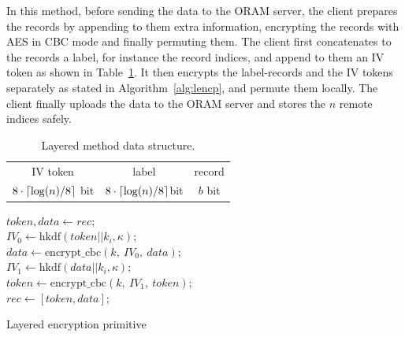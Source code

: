 \documentclass[USenglish,oneside,twocolumn]{article}
\DeclarePairedDelimiter{\ceil}{\lceil}{\rceil}
\begin{document}
\vspace{-.375cm}

In this method, before sending the data to the ORAM server, the client prepares the records by appending to them extra information, encrypting  the records with AES in CBC mode and finally permuting them. The client first concatenates to the records a label, for instance the record indices, and append to them an IV token as shown in Table~\ref{ldata}. It then encrypts the label-records and the IV tokens separately as stated in Algorithm~\ref{alg:lencp}, and permute them locally. The client finally uploads the data to the ORAM server and stores the $n$ remote indices safely.
 
\vspace{-.25cm}
 
\begin{table}[H]
\begin{minipage}[t][][b]{.475\textwidth}
\vspace{0pt}
\centering
\begin{tabular}{|c|c|c|}
IV token  &  label & record\\
$8\cdot\ceil{\log(n)/8}$ bit  &  $8\cdot\ceil{\log(n)/8}$bit &$b$ bit   \\
\end{tabular}
\centering
\caption{Layered method data structure.}
\label{ldata}
\end{minipage}
\end{table}

\vspace{-1.3cm}

\begin{algorithm}
\DontPrintSemicolon
{}
$token, data \gets rec$;\\
$IV_0 \gets \text{hkdf}(token||k_i, \kappa)$;\\
$data \gets \text{encrypt\_cbc}\left(k,\ IV_0,\ data \right )$;\\
$IV_1 \gets \text{hkdf}(data || k_i, \kappa)$;\\
$token \gets \text{encrypt\_cbc}\left(k,\ IV_1,\ token \right )$;\\
$rec \gets [token, data]$;\\
\caption{Layered encryption primitive}
\label{alg:lencp}
\end{algorithm}

\vspace{-.4cm}
\end{document}
